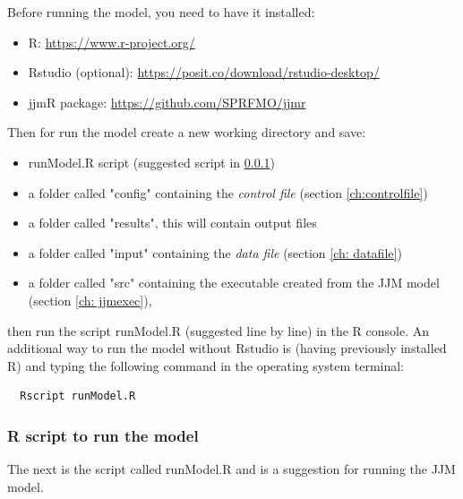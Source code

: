 \documentclass{article}
\begin{document}
Before running the model, you need to have it installed:

\begin{itemize}
    \item R: \url{https://www.r-project.org/}
    \item Rstudio (optional): \url{https://posit.co/download/rstudio-desktop/}
    \item jjmR package: \url{https://github.com/SPRFMO/jjmr}
\end{itemize}

Then for run the model create a new working directory and save:
\begin{itemize}
    \item runModel.R script (suggested script in \ref{ch: runscript})
    \item a folder called "config" containing the \textit{control file} (section \ref{ch:controlfile})
    \item a folder called "results", this will contain output files 
    \item a folder called "input" containing the \textit{data file} (section \ref{ch: datafile})
    \item a folder called "src" containing the executable created from the JJM model (section \ref{ch: jjmexec}),
\end{itemize}
then run the script runModel.R (suggested line by line) in the R console. An additional way to run the model without Rstudio is (having previously installed R) and typing the following command in the operating system terminal: 
\begin{lstlisting}
  Rscript runModel.R
\end{lstlisting}

\subsubsection{R script to run the model} \label{ch: runscript}
The next is the script called runModel.R and is a suggestion for running the JJM model.








\end{document}
